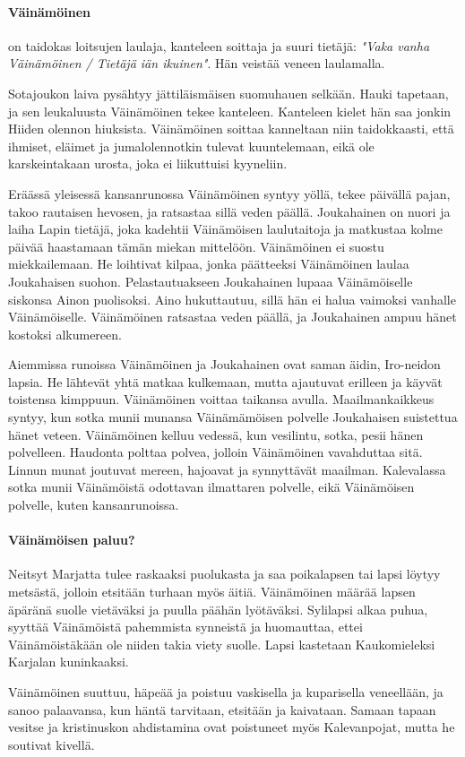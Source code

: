   \paragraph{Väinämöinen} on taidokas loitsujen laulaja, kanteleen soittaja ja suuri tietäjä:
    \emph{"Vaka vanha Väinämöinen / Tietäjä iän ikuinen"}. Hän veistää veneen laulamalla.
    \par
    Sotajoukon laiva pysähtyy jättiläismäisen suomuhauen selkään. Hauki tapetaan, ja sen
    leukaluusta Väinämöinen tekee kanteleen. Kanteleen kielet hän saa jonkin Hiiden olennon
    hiuksista. Väinämöinen soittaa kanneltaan niin taidokkaasti, että ihmiset, eläimet ja
    jumalolennotkin tulevat kuuntelemaan, eikä ole karskeintakaan urosta, joka ei liikuttuisi
    kyyneliin.
    \par
    Eräässä yleisessä kansanrunossa Väinämöinen syntyy yöllä, tekee päivällä pajan, takoo
    rautaisen hevosen, ja ratsastaa sillä veden päällä. Joukahainen on nuori ja laiha Lapin
    tietäjä, joka kadehtii Väinämöisen laulutaitoja ja matkustaa kolme päivää haastamaan tämän
    miekan mittelöön. Väinämöinen ei suostu miekkailemaan. He loihtivat kilpaa, jonka päätteeksi
    Väinämöinen laulaa Joukahaisen suohon. Pelastautuakseen Joukahainen lupaaa Väinämöiselle
    siskonsa Ainon puolisoksi. Aino hukuttautuu, sillä hän ei halua vaimoksi vanhalle
    Väinämöiselle. Väinämöinen ratsastaa veden päällä, ja Joukahainen ampuu hänet kostoksi
    alkumereen.
    \par
    Aiemmissa runoissa Väinämöinen ja Joukahainen ovat saman äidin, Iro-neidon lapsia. He lähtevät
    yhtä matkaa kulkemaan, mutta ajautuvat erilleen ja käyvät toistensa kimppuun. Väinämöinen
    voittaa taikansa avulla. Maailmankaikkeus syntyy, kun sotka munii munansa Väinämämöisen
    polvelle Joukahaisen suistettua hänet veteen. Väinämöinen kelluu vedessä, kun vesilintu, sotka,
    pesii hänen polvelleen. Haudonta polttaa polvea, jolloin Väinämöinen vavahduttaa sitä.
    Linnun munat joutuvat mereen, hajoavat ja synnyttävät maailman. Kalevalassa sotka munii
    Väinämöistä odottavan ilmattaren polvelle, eikä Väinämöisen polvelle, kuten kansanrunoissa.
  \paragraph{Väinämöisen paluu?} Neitsyt Marjatta tulee raskaaksi puolukasta ja saa poikalapsen
    tai lapsi löytyy metsästä, jolloin etsitään turhaan myös äitiä. Väinämöinen määrää lapsen
    äpäränä suolle vietäväksi ja puulla päähän lyötäväksi. Sylilapsi alkaa puhua, syyttää
    Väinämöistä pahemmista synneistä ja huomauttaa, ettei Väinämöistäkään ole niiden takia viety
    suolle. Lapsi kastetaan Kaukomieleksi Karjalan kuninkaaksi.
    \par
    Väinämöinen suuttuu, häpeää ja poistuu vaskisella ja kuparisella veneellään, ja sanoo
    palaavansa, kun häntä tarvitaan, etsitään ja kaivataan. Samaan tapaan vesitse ja kristinuskon
    ahdistamina ovat poistuneet myös Kalevanpojat, mutta he soutivat kivellä.


